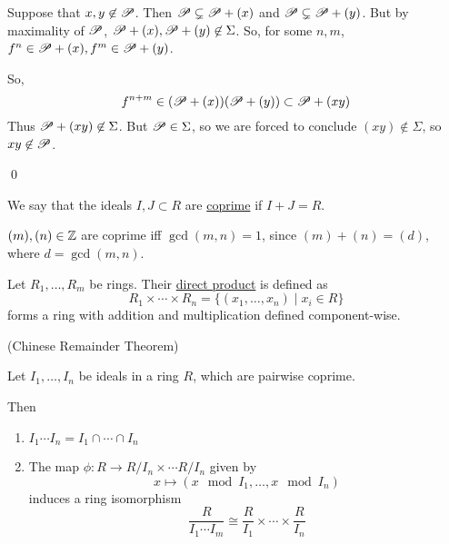 \documentclass[x11names,reqno,14pt]{extarticle}
\begin{document}
Suppose that $x, y \not\in\mathscr{P}$. Then $\mathscr{P}\subsetneq\mathscr{P}+(x)$ and $\mathscr{P}\subsetneq\mathscr{P} + (y)$. But by maximality of $\mathscr{P}$, $\mathscr{P} + (x), \mathscr{P} + (y) \not\in\Sigma$. So, for some $n, m$, $f^n\in\mathscr{P}+(x), f^m \in \mathscr{P}+(y)$. 

So, 
\[
f^{n + m} \in(\mathscr{P}+(x))(\mathscr{P}+(y))\subset \mathscr{P}+(xy)
\]
Thus $\mathscr{P}+(xy)\not\in\Sigma$. But $\mathscr{P}\in\Sigma$, so we are forced to conclude $(xy)\not\in\Sigma$, so $xy\not\in\mathscr{P}$. 

\qed

 We say that the ideals $I, J \subset R$ are \underline{coprime} if $I + J = R$. 

\exm

$(m), (n) \in \mathbb{Z}$ are coprime iff $\gcd(m, n) = 1$, since $(m) + (n) = (d)$, where $d = \gcd(m, n)$. 


Let $R_1, \dots, R_m$ be rings. Their \underline{direct product} is defined as
\[
R_1\times\cdots\times R_n = \{(x_1, \dots, x_n)\mid x_i \in R\}
\]
forms a ring with addition and multiplication defined component-wise. 

\thm (Chinese Remainder Theorem) 

Let $I_1, \dots, I_n$ be ideals in a ring $R$, which are pairwise coprime. 

Then
\begin{enumerate}[label=(\roman*)]
\item $I_1\cdots I_n = I_1 \cap \cdots \cap I_n$
\item The map $\phi:R\to R/I_n\times\cdots R/I_n$ given by 
\[
x\mapsto(x\mod I_1, \dots, x\mod I_n)
\]
induces a ring isomorphism
\[
\frac{R}{I_1\cdots I_m} \cong \frac{R}{I_1}\times\cdots\times\frac{R}{I_n}
\]

\end{enumerate}

\proof
\end{document}
